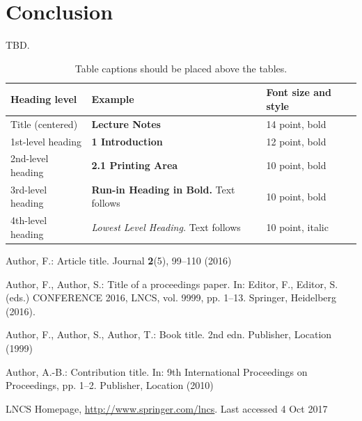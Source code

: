 \documentclass[runningheads]{llncs}
\begin{document}
\section{Conclusion}
\label{sec:conclude}
TBD.
\begin{table}
\caption{Table captions should be placed above the
tables.}\label{tab1}
\begin{tabular}{|l|l|l|}
\hline
Heading level &  Example & Font size and style\\
\hline
Title (centered) &  {\Large\bfseries Lecture Notes} & 14 point, bold\\
1st-level heading &  {\large\bfseries 1 Introduction} & 12 point, bold\\
2nd-level heading & {\bfseries 2.1 Printing Area} & 10 point, bold\\
3rd-level heading & {\bfseries Run-in Heading in Bold.} Text follows & 10 point, bold\\
4th-level heading & {\itshape Lowest Level Heading.} Text follows & 10 point, italic\\
\hline
\end{tabular}
\end{table}
%
%
%
% 
% 
%
\begin{thebibliography}{8}
Author, F.: Article title. Journal \textbf{2}(5), 99--110 (2016)

Author, F., Author, S.: Title of a proceedings paper. In: Editor,
F., Editor, S. (eds.) CONFERENCE 2016, LNCS, vol. 9999, pp. 1--13.
Springer, Heidelberg (2016). 

Author, F., Author, S., Author, T.: Book title. 2nd edn. Publisher,
Location (1999)

Author, A.-B.: Contribution title. In: 9th International Proceedings
on Proceedings, pp. 1--2. Publisher, Location (2010)

LNCS Homepage, \url{http://www.springer.com/lncs}. Last accessed 4
Oct 2017
\end{thebibliography}
\end{document}

